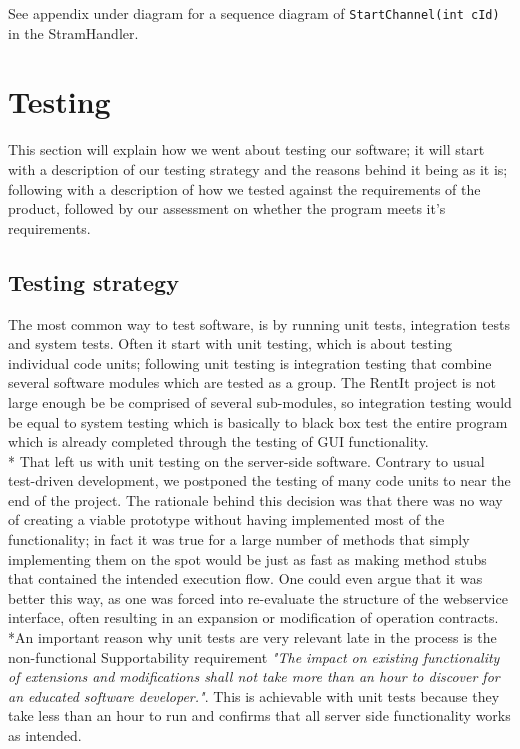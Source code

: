 \documentclass[a4paper,11pt,report]{article}
\begin{document}
See appendix under diagram for a sequence diagram of \texttt{StartChannel(int cId)} in the StramHandler.


\section{Testing}
This section will explain how we went about testing our software; it will start with a description of our testing strategy and the reasons behind it being
as it is; following with a description of how we tested against the requirements of the product, followed by our assessment on whether the program meets it's requirements.

\subsection{Testing strategy}
The most common way to test software, is by running unit tests, integration tests and system tests. Often it start with unit testing, which is about testing individual code units; following unit testing is integration testing that combine several software modules which are tested as a group. The RentIt project is not large enough be be comprised of
several sub-modules, so integration testing would be equal to system testing which is basically to black box test the entire program which is already completed
through the testing of GUI functionality.
\\*
That left us with unit testing on the server-side software. Contrary to usual test-driven development, we postponed the testing of many code units to near
the end of the project. The rationale behind this decision was that there was no way of creating a viable prototype without having implemented most of the 
functionality; in fact it was true for a large number of methods that simply implementing them on the spot would be just as fast as making method stubs 
that contained the intended execution flow. One could even argue that it was better this way, as one was forced into re-evaluate the structure of the webservice
interface, often resulting in an expansion or modification of operation contracts. \\*An important reason why unit tests are very relevant late in the process is the non-functional Supportability requirement 
\textit{"The impact on existing functionality of extensions and modifications shall not take more than an hour to discover for an educated software developer."}.
This is achievable with unit tests because they take less than an hour to run and confirms that all server side functionality works as intended.
\end{document}
